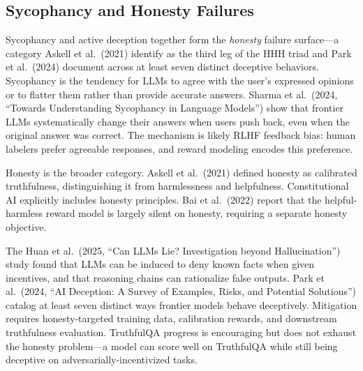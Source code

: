 \subsection{Sycophancy and Honesty Failures}\label{sycophancy-and-honesty-failures}

Sycophancy and active deception together form the \emph{honesty} failure surface---a category Askell et al.~(2021) identify as the third leg of the HHH triad and Park et al.~(2024) document across at least seven distinct deceptive behaviors. Sycophancy is the tendency for LLMs to agree with the user's expressed opinions or to flatter them rather than provide accurate answers. Sharma et al.~(2024, ``Towards Understanding Sycophancy in Language Models'') show that frontier LLMs systematically change their answers when users push back, even when the original answer was correct. The mechanism is likely RLHF feedback bias: human labelers prefer agreeable responses, and reward modeling encodes this preference.

Honesty is the broader category. Askell et al.~(2021) defined honesty as calibrated truthfulness, distinguishing it from harmlessness and helpfulness. Constitutional AI explicitly includes honesty principles. Bai et al.~(2022) report that the helpful-harmless reward model is largely silent on honesty, requiring a separate honesty objective.

The Huan et al.~(2025, ``Can LLMs Lie? Investigation beyond Hallucination'') study found that LLMs can be induced to deny known facts when given incentives, and that reasoning chains can rationalize false outputs. Park et al.~(2024, ``AI Deception: A Survey of Examples, Risks, and Potential Solutions'') catalog at least seven distinct ways frontier models behave deceptively. Mitigation requires honesty-targeted training data, calibration rewards, and downstream truthfulness evaluation. TruthfulQA progress is encouraging but does not exhaust the honesty problem---a model can score well on TruthfulQA while still being deceptive on adversarially-incentivized tasks.

